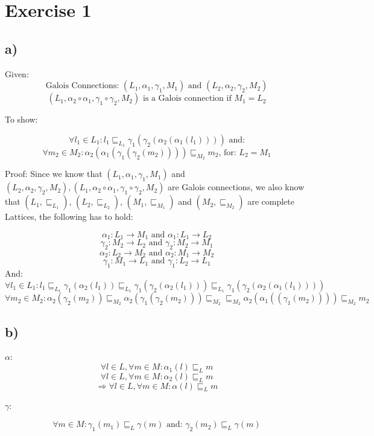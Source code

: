 \documentclass[fleqn,12pt]{article}
\begin{document}
\section*{Exercise 1}
\subsection*{a)}
Given:
$$\text{Galois Connections: } (L_1, \alpha_1, \gamma_1, M_1) \text{ and } (L_2, \alpha_2, \gamma_2, M_2)$$
$$(L_1, \alpha_2 \circ \alpha_1, \gamma_1 \circ \gamma_2,  M_2) \text{ is a Galois connection if } M_1 = L_2$$

To show:

$$\forall l_1 \in L_1: l_1 \sqsubseteq_{L_1} \gamma_1(\gamma_2(\alpha_2(\alpha_1(l_1)))) \text{ and:}$$
$$\forall m_2 \in M_2: \alpha_2(\alpha_1(\gamma_1(\gamma_2(m_2))))  \sqsubseteq_{M_2} m_2 \text{, for: } L_2 = M_1$$

Proof:
Since we know that $(L_1, \alpha_1, \gamma_1, M_1)$ and $(L_2, \alpha_2, \gamma_2, M_2), 
(L_1, \alpha_2 \circ \alpha_1, \gamma_1 \circ \gamma_2,  M_2)$ are Galois connections, we also know that $(L_1, \sqsubseteq_{L_1})$, $(L_2, \sqsubseteq_{L_2})$, $(M_1, \sqsubseteq_{M_1})$ and $(M_2, \sqsubseteq_{M_2})$ are complete Lattices, the following has to hold:

$$\alpha_1:L_1 \rightarrow M_1 \text{ and } \alpha_1:L_1 \rightarrow L_2$$
$$\gamma_2:M_2 \rightarrow L_2 \text{ and } \gamma_2:M_2 \rightarrow M_1$$
$$\alpha_2:L_2 \rightarrow M_2 \text{ and } \alpha_2:M_1 \rightarrow M_2$$
$$\gamma_1:M_1 \rightarrow L_1 \text{ and } \gamma_1:L_2 \rightarrow L_1$$
And:
$$\forall l_1 \in L_1:l_1\sqsubseteq_{L_1} \gamma_1(\alpha_2(l_1)) \sqsubseteq_{L_1} \gamma_1(\gamma_2(\alpha_2(l_1))) \sqsubseteq_{L_1} \gamma_1(\gamma_2(\alpha_2(\alpha_1(l_1))))$$
$$\forall m_2 \in M_2:\alpha_2(\gamma_2(m_2))\sqsubseteq_{M_2} \alpha_2(\gamma_1(\gamma_2(m_2)))\sqsubseteq_{M_2} \sqsubseteq_{M_2} \alpha_2(\alpha_1((\gamma_1(m_2))))\sqsubseteq_{M_2} m_2$$

\subsection*{b)}

$\alpha$:
$$\forall l \in L,\forall m \in M: \alpha_1(l) \sqsubseteq_{L} m$$
$$\forall l \in L,\forall m \in M: \alpha_2(l) \sqsubseteq_{L} m$$
$$\Rightarrow \forall l \in L,\forall m \in M: \alpha(l) \sqsubseteq_{L} m$$

$\gamma$:

$$\forall m \in M: \gamma_1(m_1) \sqsubseteq_L \gamma(m) \text{ and: } \gamma_2(m_2) \sqsubseteq_L \gamma(m)$$
\end{document}
